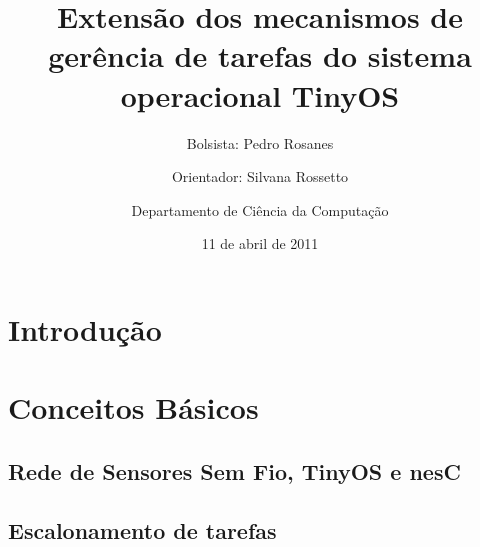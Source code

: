 \documentclass[a4paper, 10pt]{article}
\title{Extensão dos mecanismos de gerência de tarefas do sistema operacional TinyOS}
\author{Bolsista: Pedro Rosanes \and Orientador: Silvana Rossetto \and Departamento de Ciência da Computação}
\date{11 de abril de 2011}
\begin{document}
\begin{titlepage}
\maketitle
\tableofcontents
\end{titlepage}



\section{Introdução}\label{intro}


\section{Conceitos Básicos}\label{teoria}

\subsection{Rede de Sensores Sem Fio, TinyOS e nesC}


\subsection{Escalonamento de tarefas}

\end{document}
